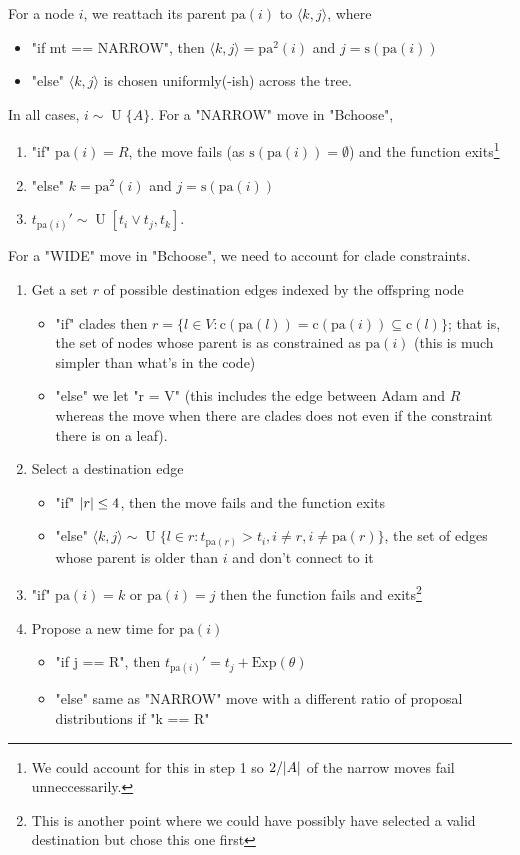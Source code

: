 \documentclass[11pt,a4paper]{article}
\newcommand{\edge}[2]{\langle#1, #2\rangle}
\newcommand{\pa}{\mathrm{pa}}
\newcommand{\sib}{\mathrm{s}}
\newcommand{\cla}{\mathrm{c}}
\newcommand{\Exp}[1]{\mathrm{Exp}(#1)}
\DeclarePairedDelimiter\abs{\lvert}{\rvert}%
\DeclareMathOperator*{\Unif}{\mathrm{U}}
\begin{document}
For a node $ i $, we reattach its parent $ \pa(i) $ to $ \edge{k}{j} $, where
\begin{itemize}
    \item "if mt == NARROW", then $ \edge{k}{j} = \pa^2(i) $ and $ j = \sib(\pa(i)) $
    \item "else" $ \edge{k}{j} $ is chosen uniformly(-ish) across the tree.
\end{itemize}



In all cases, $ i \sim \Unif\{A\} $. For a "NARROW" move in "Bchoose",
\begin{enumerate}
    \item "if" $ \pa(i) = R $, the move fails (as $ \sib(\pa(i)) = \emptyset $) and the function exits\footnote{We could account for this in step 1 so $ 2 / \abs{A} $ of the narrow moves fail unneccessarily.}
    \item "else" $ k = \pa^2(i) $ and $ j = \sib(\pa(i)) $
    \item $ t_{\pa(i)}' \sim \Unif[t_i \vee t_j, t_k] $.
\end{enumerate}
For a "WIDE" move in "Bchoose", we need to account for clade constraints.
\begin{enumerate}
    \item Get a set $ r $ of possible destination edges indexed by the offspring node
    \begin{itemize}
        \item "if" clades then $ r = \{l \in V: \cla(\pa(l)) = \cla(\pa(i)) \subseteq \cla(l)\} $; that is, the set of nodes whose parent is as constrained as $ \pa(i) $ (this is much simpler than what's in the code)
        \item "else" we let "r = V" (this includes the edge between Adam and $ R $ whereas the move when there are clades does not even if the constraint there is on a leaf).
    \end{itemize}
    \item Select a destination edge
    \begin{itemize}
        \item "if" $ \abs{r} \leq 4 $, then the move fails and the function exits
        \item "else" $ \edge{k}{j} \sim \Unif\{l \in r : t_{\pa(r)} > t_i, i \neq r, i \neq \pa(r)\} $, the set of edges whose parent is older than $ i $ and don't connect to it
    \end{itemize}
    \item "if" $ \pa(i) = k $ or $ \pa(i) = j $ then the function fails and exits\footnote{This is another point where we could have possibly have selected a valid destination but chose this one first}
    \item Propose a new time for $ \pa(i) $
    \begin{itemize}
        \item "if j == R", then $ t_{\pa(i)}' = t_j + \Exp{\theta} $
        \item "else" same as "NARROW" move with a different ratio of proposal distributions if "k == R"
    \end{itemize}
\end{enumerate}
\end{document}
